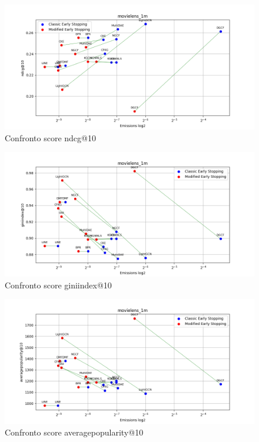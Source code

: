 \begin{figure}[H]
    \centering
    \includegraphics[width=\linewidth, trim=0 0 0 0]{images/ndcg@10_movielens_1m_30_6_comparison.png}
    \caption{Confronto score ndcg@10}
    
\end{figure}

\begin{figure}[H]
    \centering
    \includegraphics[width=\linewidth, trim=0 0 0 0]{images/giniindex@10_movielens_1m_30_6_comparison.png}
    \caption{Confronto score giniindex@10}
\end{figure}

\begin{figure}[H]
    \centering
    \includegraphics[width=\linewidth, trim=0 0 0 0]{images/averagepopularity@10_movielens_1m_30_6_comparison.png}
    \caption{Confronto score averagepopularity@10}
\end{figure}


